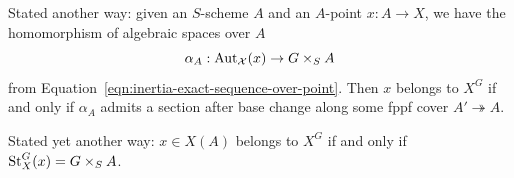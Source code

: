 \begin{remark}\label{rl-001D}
  Stated another way: given an \(S\)-scheme \(A\) and an \(A\)-point \(x:A\to X\), we have the homomorphism of algebraic spaces over \(A\)
  \[\alpha_A:\operatorname{Aut}_{\mathcal X}(x) \to G\times_SA\]
  from Equation~\ref{eqn:inertia-exact-sequence-over-point}. Then \(x\) belongs to \(X^G\) if and only if \(\alpha_A\) admits a section after base change along some fppf cover \(A' \twoheadrightarrow A\).

  \bigskip
  
  \noindent Stated yet another way: \(x\in X(A)\) belongs to \(X^G\) if and only if \(\operatorname{St}^G_X(x) = G\times_S A\).
\end{remark}

